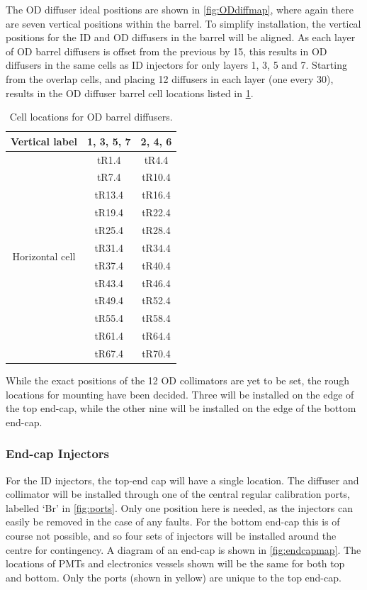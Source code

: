 \documentclass[a4paper,11pt]{article}
\begin{document}
The OD diffuser ideal positions are shown in \cref{fig:ODdiffmap}, where again there are seven vertical positions within the barrel. To simplify installation, the vertical positions for the ID and OD diffusers in the barrel will be aligned. As each layer of OD barrel diffusers is offset from the previous by 15\degree , this results in OD diffusers in the same cells as ID injectors for only layers 1, 3, 5 and 7. Starting from the overlap cells, and placing 12 diffusers in each layer (one every 30\degree), results in the OD diffuser barrel cell locations listed in \cref{tab:ODdiffBarrel}.
\begin{table}[h!]
\centering
\begin{tabular}{c|cc} \toprule
Vertical label 			& 1, 3, 5, 7 & 2, 4, 6 \\ \midrule
\multirow{12}{*}{Horizontal cell}	&	tR1.4	&	tR4.4 	\\
						&	tR7.4	&	tR10.4	\\
						&	tR13.4	&	tR16.4	\\
						&	tR19.4	&	tR22.4	\\
						&	tR25.4	&	tR28.4	\\
						&	tR31.4	&	tR34.4	\\
						&	tR37.4	&	tR40.4	\\
						&	tR43.4	&	tR46.4	\\
						&	tR49.4	&	tR52.4	\\
						&	tR55.4	&	tR58.4	\\
						&	tR61.4	&	tR64.4	\\
						&	tR67.4	&	tR70.4	\\ \bottomrule
\end{tabular}
\caption{Cell locations for OD barrel diffusers.}\label{tab:ODdiffBarrel}
\end{table}

While the exact positions of the 12 OD collimators are yet to be set, the rough locations for mounting have been decided. Three will be installed on the edge of the top end-cap, while the other nine will be installed on the edge of the bottom end-cap.

\subsubsection{End-cap Injectors}

For the ID injectors, the top-end cap will have a single location. The diffuser and collimator will be installed through one of the central regular calibration ports, labelled `Br' in \cref{fig:ports}. Only one position here is needed, as the injectors can easily be removed in the case of any faults. For the bottom end-cap this is of course not possible, and so four sets of injectors will be installed around the centre for contingency. A diagram of an end-cap is shown in \cref{fig:endcapmap}. The locations of PMTs and electronics vessels shown will be the same for both top and bottom. Only the ports (shown in yellow) are unique to the top end-cap.
\end{document}
